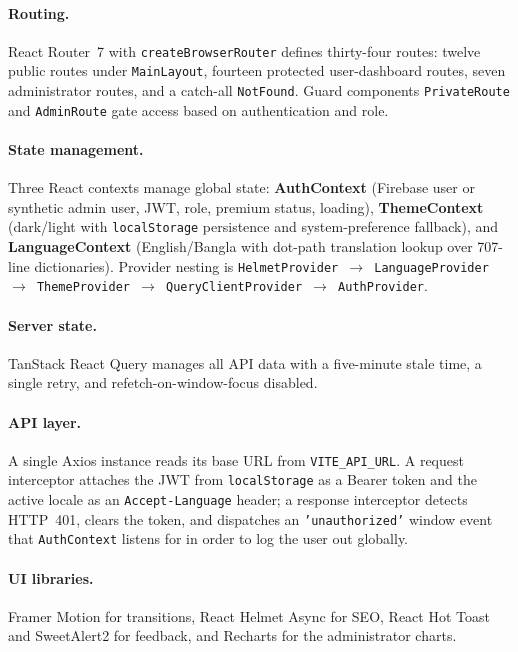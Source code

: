 \documentclass[12pt,a4paper]{report}
\begin{document}
\paragraph{Routing.} React Router~7 with \texttt{createBrowserRouter} defines
thirty-four routes: twelve public routes under \texttt{MainLayout}, fourteen
protected user-dashboard routes, seven administrator routes, and a catch-all
\texttt{NotFound}. Guard components \texttt{PrivateRoute} and
\texttt{AdminRoute} gate access based on authentication and role.

\paragraph{State management.} Three React contexts manage global state:
\textbf{AuthContext} (Firebase user or synthetic admin user, JWT, role, premium
status, loading), \textbf{ThemeContext} (dark/light with
\texttt{localStorage} persistence and system-preference fallback), and
\textbf{LanguageContext} (English/Bangla with dot-path translation lookup over
707-line dictionaries). Provider nesting is
\texttt{HelmetProvider $\to$ LanguageProvider $\to$ ThemeProvider $\to$
QueryClientProvider $\to$ AuthProvider}.

\paragraph{Server state.} TanStack React Query manages all API data with a
five-minute stale time, a single retry, and refetch-on-window-focus disabled.

\paragraph{API layer.} A single Axios instance reads its base URL from
\texttt{VITE\_API\_URL}. A request interceptor attaches the JWT from
\texttt{localStorage} as a Bearer token and the active locale as an
\texttt{Accept-Language} header; a response interceptor detects HTTP~401,
clears the token, and dispatches an \texttt{'unauthorized'} window event that
\texttt{AuthContext} listens for in order to log the user out globally.

\paragraph{UI libraries.} Framer Motion for transitions, React Helmet Async for
SEO, React Hot Toast and SweetAlert2 for feedback, and Recharts for the
administrator charts.
\end{document}
